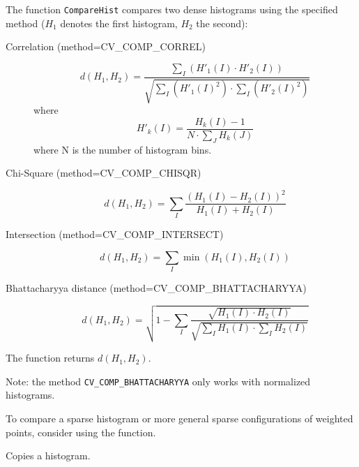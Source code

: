 \begin{description}
\end{description}

The function \texttt{CompareHist} compares two dense histograms using the specified method ($H_1$ denotes the first histogram, $H_2$ the second):

\begin{description}
\item[Correlation (method=CV\_COMP\_CORREL)]
\[
d(H_1,H_2) = \frac
{\sum_I (H'_1(I) \cdot H'_2(I))}
{\sqrt{\sum_I(H'_1(I)^2) \cdot \sum_I(H'_2(I)^2)}}
\]
where
\[
H'_k(I) = \frac{H_k(I) - 1}{N \cdot \sum_J H_k(J)}
\]
where N is the number of histogram bins.

\item[Chi-Square (method=CV\_COMP\_CHISQR)]
\[ d(H_1,H_2) = \sum_I \frac{(H_1(I)-H_2(I))^2}{H_1(I)+H_2(I)} \]

\item[Intersection (method=CV\_COMP\_INTERSECT)]
\[ d(H_1,H_2) = \sum_I \min (H_1(I), H_2(I)) \]

\item[Bhattacharyya distance (method=CV\_COMP\_BHATTACHARYYA)]
\[ d(H_1,H_2) = \sqrt{1 - \sum_I \frac{\sqrt{H_1(I) \cdot H_2(I)}}{ \sqrt { \sum_I H_1(I) \cdot \sum_I H_2(I) }}} \]

\end{description}

The function returns $d(H_1, H_2)$.

Note: the method \texttt{CV\_COMP\_BHATTACHARYYA} only works with normalized histograms.

To compare a sparse histogram or more general sparse configurations of weighted points, consider using the  function.

\ifC
{}\label{CopyHist}

Copies a histogram.


\begin{description}
\end{description}

